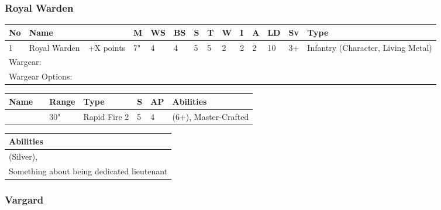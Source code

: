 \newpage
\subsubsection{Royal Warden}

\noindent
\begin{tabular}{||m{10pt} m{90pt} m{30pt} m{11pt} m{11pt} m{11pt} m{11pt} m{11pt} m{11pt} m{11pt} m{11pt} m{11pt} m{11pt} m{135pt}||}
	\hline
	No & Name & & M & WS & BS & S & T & W & I & A & LD & Sv & Type \\
	\hline
	1 & Royal Warden & +X points & 7" & 4 & 4 & 5 & 5 & 2 & 2 & 2 & 10 & 3+ & Infantry (Character, Living Metal)\\
	\hline
	\hline
	\multicolumn{14}{||Z{532 pt}||}{Wargear: \quickref{Relic Gauss Blaster}}\\
	\multicolumn{14}{||Z{532 pt}||}{Wargear Options:} \\	
	\hline
\end{tabular}

\noindent
\begin{tabular}{||m{110pt} m{30pt} m{31pt} m{55pt} m{12pt} m{12pt} m{210pt}||}
	\hline
	Name & & Range & Type & S & AP & Abilities \\
	\hline
	\quickref{Relic Gauss Blaster} & & 30" & Rapid Fire 2 & 5 & 4 & \quickref{Gauss} (6+), Master-Crafted \\
	\hline
\end{tabular}

\noindent
\begin{tabular}{||m{532pt}||}
	\hline
	Abilities \\
	\hline
	\quickref{Awakening Protocols}(Silver), \quickref{Reanimation Protocols} \\
	Something about being dedicated lieutenant \\
	\hline
\end{tabular}



\newpage
\subsubsection{Vargard}

